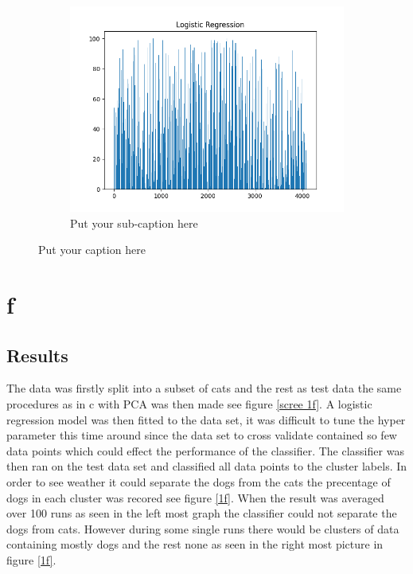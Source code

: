 \documentclass{article}
\begin{document}
\begin{figure}[H]
\begin{subfigure}{.33\textwidth}
  \centering
  \includegraphics[width=1\linewidth]{1e/Cats 5 clusters/selected LogReg.png}  
  \caption{Put your sub-caption here}
  \label{fig:sub-second}
\end{subfigure}
\caption{Put your caption here}
\label{example dog}
\end{figure}

\newpage
\section{f}
\subsection{Results}
The data was firstly split into a subset of cats and the rest as test data the same procedures as in c with PCA was then made see figure \ref{scree 1f}. A logistic regression model was then fitted to the data set, it was difficult to tune the hyper parameter this time around since the data set to cross validate contained so few data points which could effect  the performance of the classifier. The classifier was then ran on the test data set and classified all data points to the cluster labels. In order to see weather it could separate the dogs from the cats the precentage of dogs in each cluster was recored see figure \ref{1f}. When the result was averaged over 100 runs as seen in the left most graph the classifier could not separate the dogs from cats. However during some single runs there would be clusters of data containing mostly dogs and the rest none as seen in the right most picture in figure \ref{1f}. 
\end{document}
